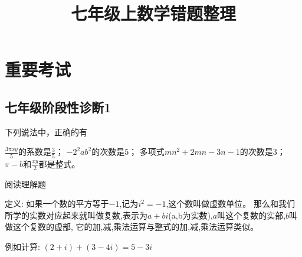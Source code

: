 \documentclass[answers]{exam}
\title{七年级上数学错题整理}
\newcommand\epart{\part}
\begin{document}
\maketitle

\section{重要考试}

\subsection{七年级阶段性诊断1}

\begin{questions}
\question
下列说法中，正确的有\fillin
  
\begin{oneparchoices}
  \choice $\frac{3 \pi xy}{5}$的系数是$\frac{3}{5}$；
  \correctchoice $-2^2ab^2$的次数是$5$；
  \choice 多项式$mn^2+2mn-3n-1$的次数是$3$；
  \choice $\pi - b$和$\frac{xy}{2}$都是整式。
\end{oneparchoices}

\question
阅读理解题

定义:
如果一个数的平方等于$-1$,记为$i^2=-1$,这个数叫做虚数单位。
那么和我们所学的实数对应起来就叫做复数,表示为$a+bi$(a,b为实数),$a$叫这个复数的实部,$b$叫做这个复数的虚部,
它的加,减,乘法运算与整式的加,减,乘法运算类似。

例如计算: $(2+i) + (3-4i)=5-3i$

\end{questions}
\end{document}
